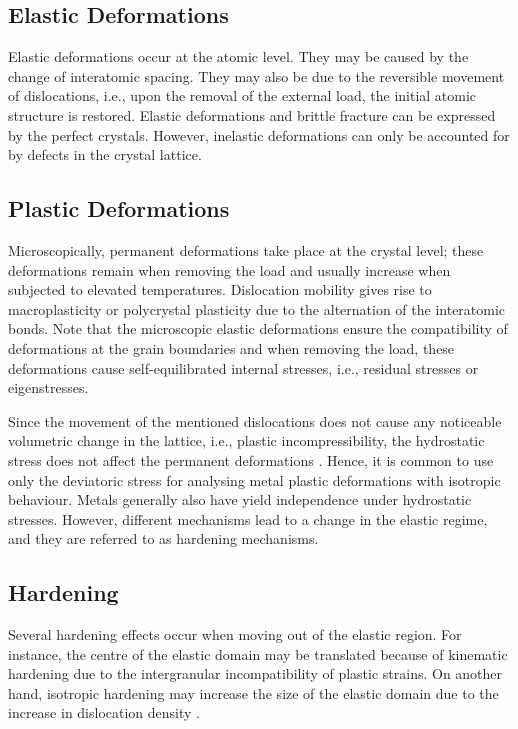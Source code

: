 \subsection{Elastic Deformations}
Elastic deformations occur at the atomic level. They may be caused by the change of interatomic spacing. They may also be due to the reversible movement of dislocations, i.e., upon the removal of the external load, the initial atomic structure is restored. Elastic deformations and brittle fracture can be expressed by the perfect crystals. However, inelastic deformations can only be accounted for by defects in the crystal lattice.

\subsection{Plastic Deformations}

Microscopically, permanent deformations take place at the crystal level; these deformations remain when removing the load and usually increase when subjected to elevated temperatures. Dislocation mobility gives rise to macroplasticity or polycrystal plasticity due to the alternation of the interatomic bonds. Note that the microscopic elastic deformations ensure the compatibility of deformations at the grain boundaries and when removing the load, these deformations cause self-equilibrated internal stresses, i.e., residual stresses or eigenstresses.

Since the movement of the mentioned dislocations does not cause any noticeable volumetric change in the lattice, i.e., plastic incompressibility, the hydrostatic stress does not affect the permanent deformations \parencite{lemaitre1994mechanics}. Hence, it is common to use only the deviatoric stress for analysing metal plastic deformations with isotropic behaviour. Metals generally also have yield independence under hydrostatic stresses. However, different mechanisms lead to a change in the elastic regime, and they are referred to as hardening mechanisms.

\subsection{Hardening}

Several hardening effects occur when moving out of the elastic region. For instance, the centre of the elastic domain may be translated because of kinematic hardening due to the intergranular incompatibility of plastic strains. On another hand, isotropic hardening may increase the size of the elastic domain due to the increase in dislocation density \parencite{lemaitre1994mechanics}.

